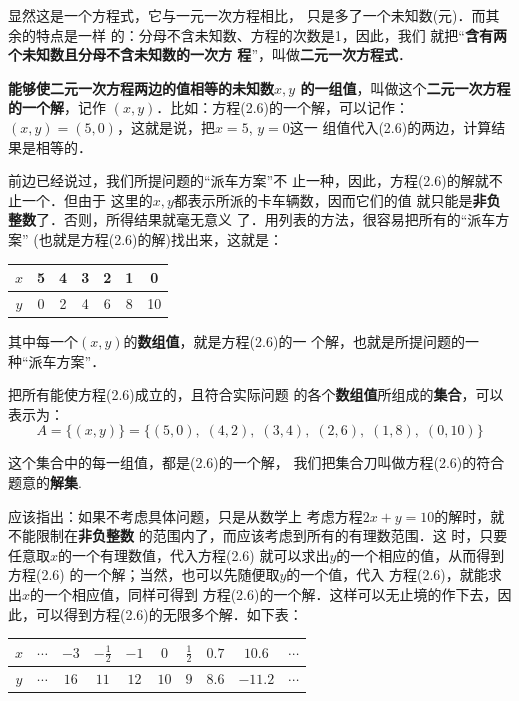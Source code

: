 显然这是一个方程式，它与一元一次方程相比，
只是多了一个未知数(元)．而其余的特点是一样
的：分母不含未知数、方程的次数是1，因此，我们
就把“\textbf{含有两个未知数且分母不含未知数的一次方
程}”，叫做\textbf{二元一次方程式}．

\textbf{能够使二元一次方程两边的值相等的未知数$x,y$
的一组值}，叫做这个\textbf{二元一次方程的一个解}，记作
$(x,y)$．比如：方程(2.6)的一个解，可以记作：
 $ (x,   y)=(5,  0)$，这就是说，把$x=5$, $y=0$这一
组值代入(2.6)的两边，计算结果是相等的．

    前边已经说过，我们所提问题的“派车方案”不
止一种，因此，方程(2.6)的解就不止一个．但由于
这里的$x,  y$都表示所派的卡车辆数，因而它们的值
就只能是\textbf{非负整数}了．否则，所得结果就毫无意义
了．用列表的方法，很容易把所有的“派车方案”
  (也就是方程(2.6)的解)找出来，这就是：
\begin{center}
    \begin{tabular}{c|cccccc}
        \hline
  $x$ &5&4&3&2&1&0\\
  \hline    
  $y$ &0&2&4&6&8&10\\
  \hline
    \end{tabular}
\end{center}
其中每一个$(x,y)$的\textbf{数组值}，就是方程(2.6)的一
个解，也就是所提问题的一种“派车方案”．

    把所有能使方程(2.6)成立的，且符合实际问题
的各个\textbf{数组值}所组成的\textbf{集合}，可以表示为：
\[A=\{(x,y)\}=\{(5,0),\; (4,2),\;(3,4),\;(2,6),\;(1,8),\;(0,10)\}\]

这个集合中的每一组值，都是(2.6)的一个解，
我们把集合刀叫做方程(2.6)的符合题意的\textbf{解集}.

    应该指出：如果不考虑具体问题，只是从数学上
考虑方程$2x + y=10$的解时，就不能限制在\textbf{非负整数}
的范围内了，而应该考虑到所有的有理数范围．这
时，只要任意取$x$的一个有理数值，代入方程(2.6)
就可以求出$y$的一个相应的值，从而得到方程(2.6)
的一个解；当然，也可以先随便取$y$的一个值，代入
方程(2.6)，就能求出$x$的一个相应值，同样可得到
方程(2.6)的一个解．这样可以无止境的作下去，因
此，可以得到方程(2.6)的无限多个解．如下表：
\begin{center}
    \renewcommand{\arraystretch}{1.8}
    \begin{tabular}{c|ccccccccc}
        \hline
  $x$ &$\cdots$& $-3$ & $-\frac{1}{2}$  & $-1$  & $0$  & $\frac{1}{2}$ & $0.7$ &$10.6$  &$\cdots$\\
  \hline    
  $y$ &$\cdots$& $16$ & $11$  & $12$  &  $10$ & $9$ & $8.6$  &$-11.2$ &$\cdots$\\
  \hline
    \end{tabular}
\end{center}

